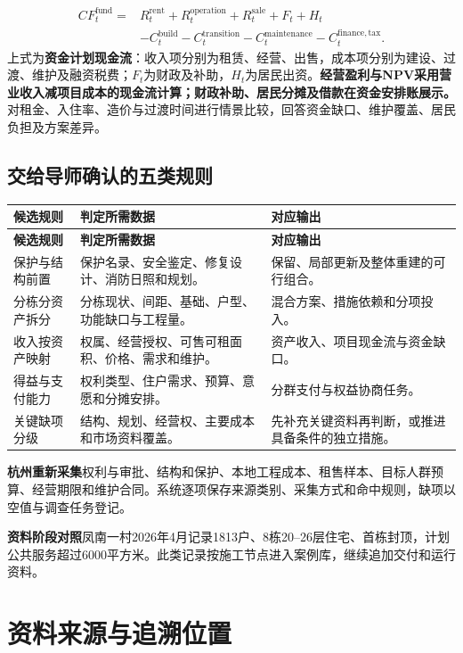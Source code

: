 \documentclass[UTF8,11pt,fontset=windows]{ctexart}
\newcommand{\field}[2]{\par\noindent\textbf{#1}\quad #2\par}
\begin{document}
\[
\begin{aligned}
CF^{\mathrm{fund}}_t={}&R^{\mathrm{rent}}_t+R^{\mathrm{operation}}_t+R^{\mathrm{sale}}_t+F_t+H_t\\
&-C^{\mathrm{build}}_t-C^{\mathrm{transition}}_t-C^{\mathrm{maintenance}}_t
-C^{\mathrm{finance,tax}}_t .
\end{aligned}
\]
上式为\textbf{资金计划现金流}：收入项分别为租赁、经营、出售，成本项分别为建设、过渡、维护及融资税费；$F_t$为财政及补助，$H_t$为居民出资。\textbf{经营盈利与NPV采用营业收入减项目成本的现金流计算；财政补助、居民分摊及借款在资金安排账展示。}对租金、入住率、造价与过渡时间进行情景比较，回答资金缺口、维护覆盖、居民负担及方案差异。

\subsection{交给导师确认的五类规则}

\begin{longtable}{@{}L{37mm}L{72mm}L{50mm}@{}}
\toprule\textbf{候选规则} & \textbf{判定所需数据} & \textbf{对应输出}\\\midrule
\endfirsthead
\toprule\textbf{候选规则} & \textbf{判定所需数据} & \textbf{对应输出}\\\midrule
\endhead
保护与结构前置 & 保护名录、安全鉴定、修复设计、消防日照和规划。 & 保留、局部更新及整体重建的可行组合。\\
分栋分资产拆分 & 分栋现状、间距、基础、户型、功能缺口与工程量。 & 混合方案、措施依赖和分项投入。\\
收入按资产映射 & 权属、经营授权、可售可租面积、价格、需求和维护。 & 资产收入、项目现金流与资金缺口。\\
得益与支付能力 & 权利类型、住户需求、预算、意愿和分摊安排。 & 分群支付与权益协商任务。\\
关键缺项分级 & 结构、规划、经营权、主要成本和市场资料覆盖。 & 先补充关键资料再判断，或推进具备条件的独立措施。\\
\bottomrule
\end{longtable}

\field{杭州重新采集}{权利与审批、结构和保护、本地工程成本、租售样本、目标人群预算、经营期限和维护合同。系统逐项保存来源类别、采集方式和命中规则，缺项以空值与调查任务登记。}

\field{资料阶段对照}{凤南一村2026年4月记录1813户、8栋20--26层住宅、首栋封顶，计划公共服务超过6000平方米。此类记录按施工节点进入案例库，继续追加交付和运行资料。\cite{S12}}

\clearpage
\section{资料来源与追溯位置}
\end{document}
